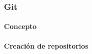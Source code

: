 \documentclass[12pt]{report}
\begin{document}
			\subsubsection{Git}
				\paragraph{Concepto}
				\paragraph{Creación de repositorios}
\end{document}
